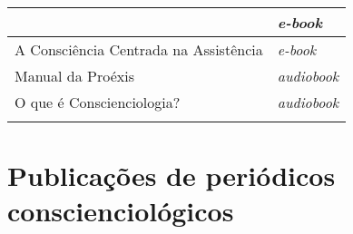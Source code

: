 \documentclass{gescons}
\begin{document}
\begin{longtable}[]{@{}
  >{\raggedright\arraybackslash}p{}
  >{\raggedright\arraybackslash}p{}@{}}
\begin{minipage}[b]{\linewidth}
\end{minipage} & \begin{minipage}[b]{\linewidth}\raggedright
\emph{e-book}
\end{minipage} \\
\hline
\begin{minipage}[b]{\linewidth}\raggedright
A Consciência Centrada na Assistência
\end{minipage} & \begin{minipage}[b]{\linewidth}\raggedright
\emph{e-book}
\end{minipage} \\
\hline
\begin{minipage}[b]{\linewidth}\raggedright
Manual da Proéxis
\end{minipage} & \begin{minipage}[b]{\linewidth}\raggedright
\emph{audiobook}
\end{minipage} \\
\hline
\begin{minipage}[b]{\linewidth}\raggedright
O que é Conscienciologia?
\end{minipage} & \begin{minipage}[b]{\linewidth}\raggedright
\emph{audiobook}
\end{minipage} \\
\midrule\noalign{}
\endhead
\bottomrule\noalign{}
\endlastfoot
\end{longtable}

\section*{Publicações de periódicos conscienciológicos}
\end{document}
